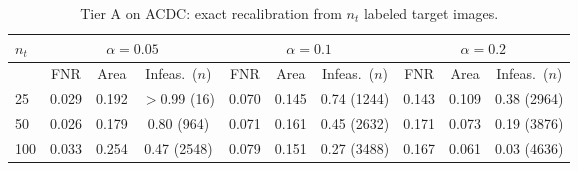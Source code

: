 \begin{table}[t]
\centering
\footnotesize
\setlength{\tabcolsep}{3pt}
\begin{tabular}{lccccccccc}
\toprule
$n_t$ & \multicolumn{3}{c}{$\alpha=0.05$} & \multicolumn{3}{c}{$\alpha=0.1$} & \multicolumn{3}{c}{$\alpha=0.2$} \\
\midrule
 & FNR & Area & Infeas.\ ($n$) & FNR & Area & Infeas.\ ($n$) & FNR & Area & Infeas.\ ($n$) \\
\midrule
25 & 0.029 & 0.192 & $>$0.99 (16) & 0.070 & 0.145 & 0.74 (1244) & 0.143 & 0.109 & 0.38 (2964) \\
50 & 0.026 & 0.179 & 0.80 (964) & 0.071 & 0.161 & 0.45 (2632) & 0.171 & 0.073 & 0.19 (3876) \\
100 & 0.033 & 0.254 & 0.47 (2548) & 0.079 & 0.151 & 0.27 (3488) & 0.167 & 0.061 & 0.03 (4636) \\
\bottomrule
\end{tabular}
\caption{Tier A on ACDC: exact recalibration from $n_t$ labeled target images.}
\label{tab:tier_a}
\end{table}
